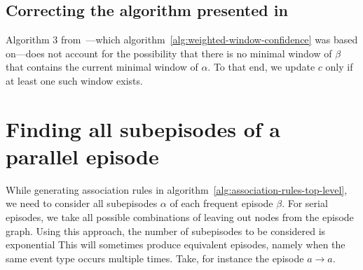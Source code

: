 \subsection{Correcting the algorithm presented in~\citep{cule2014marbles}}

Algorithm 3 from~\citep{cule2014marbles}---which algorithm~\ref{alg:weighted-window-confidence} was based on---does not account for the possibility that there is no minimal window of $ \beta $ that contains the current minimal window of $ \alpha $. To that end, we update $ c $ only if at least one such window exists.

\section{Finding all subepisodes of a parallel episode}

While generating association rules in algorithm~\ref{alg:association-rules-top-level}, we need to consider all subepisodes $ \alpha $ of each frequent episode $ \beta $. For serial episodes, we take all possible combinations of leaving out nodes from the episode graph. Using this approach, the number of subepisodes to be considered is exponential This will sometimes produce equivalent episodes, namely when the same event type occurs multiple times. Take, for instance the episode $ a \to a $.

